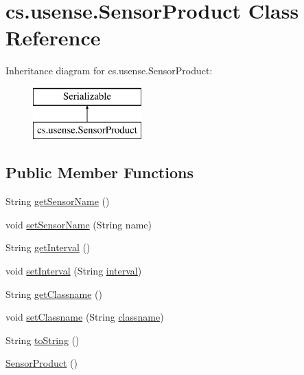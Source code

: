 \hypertarget{classcs_1_1usense_1_1_sensor_product}{}\section{cs.\+usense.\+Sensor\+Product Class Reference}
\label{classcs_1_1usense_1_1_sensor_product}
Inheritance diagram for cs.\+usense.\+Sensor\+Product\+:\begin{figure}[H]
\begin{center}
\leavevmode
\includegraphics[height=2.000000cm]{classcs_1_1usense_1_1_sensor_product}
\end{center}
\end{figure}
\subsection*{Public Member Functions}
\begin{DoxyCompactItemize}
\item 
String \hyperlink{classcs_1_1usense_1_1_sensor_product_a8068761a5230b24db66abe05234e71f4}{get\+Sensor\+Name} ()
\item 
void \hyperlink{classcs_1_1usense_1_1_sensor_product_af0b576d77b5f4ac32968d4c18c5c299e}{set\+Sensor\+Name} (String name)
\item 
String \hyperlink{classcs_1_1usense_1_1_sensor_product_a70ef8dc81de0a9c6d14c8e71984e654c}{get\+Interval} ()
\item 
void \hyperlink{classcs_1_1usense_1_1_sensor_product_a766bc3f916e5c6900ecbb742a5355e5d}{set\+Interval} (String \hyperlink{classcs_1_1usense_1_1_sensor_product_aebd637f06a6f2c572317556062f3d471}{interval})
\item 
String \hyperlink{classcs_1_1usense_1_1_sensor_product_ac7bddadb24e29639a7b96414721e03be}{get\+Classname} ()
\item 
void \hyperlink{classcs_1_1usense_1_1_sensor_product_a9cc0aaaa02ab5df4191101d3823b52f3}{set\+Classname} (String \hyperlink{classcs_1_1usense_1_1_sensor_product_af0e0eb4c2bffdf5ed7db5b68b0b61263}{classname})
\item 
String \hyperlink{classcs_1_1usense_1_1_sensor_product_ab955f137721401853f9c0c0f8390ab46}{to\+String} ()
\item 
\hyperlink{classcs_1_1usense_1_1_sensor_product_a9edf6d18ad428c358820e80d2c6b6806}{Sensor\+Product} ()
\end{DoxyCompactItemize}
